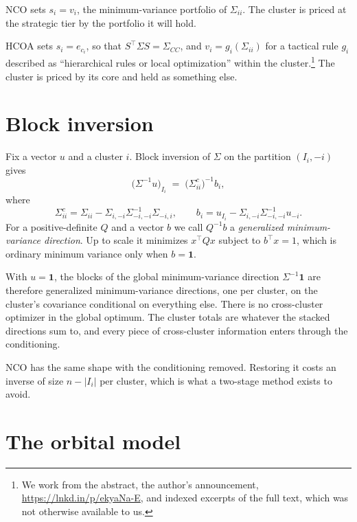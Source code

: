 \documentclass[11pt]{article}
\newcommand{\ones}{\mathbf{1}}
\begin{document}
NCO sets $s_i=v_i$, the minimum-variance portfolio of $\Sigma_{ii}$. The
cluster is priced at the strategic tier by the portfolio it will hold.

HCOA sets $s_i=e_{c_i}$, so that $S^\top\Sigma S=\Sigma_{CC}$, and
$v_i=g_i(\Sigma_{ii})$ for a tactical rule $g_i$ described as
``hierarchical rules or local optimization'' within the
cluster.\footnote{We work from the abstract, the author's announcement,
\url{https://lnkd.in/p/ekyaNa-E}, and indexed excerpts of the full text,
which was not otherwise available to us.} The cluster is priced by its core
and held as something else.

\section{Block inversion}

Fix a vector $u$ and a cluster $i$. Block inversion of $\Sigma$ on the
partition $(I_i,-i)$ gives \parencite[App.~A]{cotton2024schur}
\begin{equation}
  \big(\Sigma^{-1}u\big)_{I_i}
  \;=\; \big(\Sigma^{c}_{ii}\big)^{-1} b_i,
  \label{eq:blockinv}
\end{equation}
where
\begin{equation}
  \Sigma^{c}_{ii} = \Sigma_{ii}-\Sigma_{i,-i}\Sigma_{-i,-i}^{-1}\Sigma_{-i,i},
  \qquad
  b_i = u_{I_i}-\Sigma_{i,-i}\Sigma_{-i,-i}^{-1}u_{-i} .
  \label{eq:complement}
\end{equation}
For a positive-definite $Q$ and a vector $b$ we call $Q^{-1}b$ a
\emph{generalized minimum-variance direction}. Up to scale it minimizes
$x^\top Qx$ subject to $b^\top x=1$, which is ordinary minimum variance only
when $b=\ones$.

With $u=\ones$, the blocks of the global minimum-variance direction
$\Sigma^{-1}\ones$ are therefore generalized minimum-variance directions,
one per cluster, on the cluster's covariance conditional on everything
else. There is no cross-cluster optimizer in the global optimum. The
cluster totals are whatever the stacked directions sum to, and every piece
of cross-cluster information enters through the conditioning.

NCO has the same shape with the conditioning removed. Restoring it costs an
inverse of size $n-|I_i|$ per cluster, which is what a two-stage method
exists to avoid.

\section{The orbital model}
\end{document}
